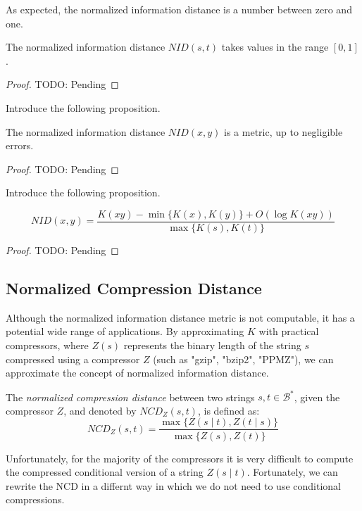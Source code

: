 As expected, the normalized information distance is a number between zero and one.

\begin{proposition}
\label{prop:ncd_between_zero_and_one}
The normalized information distance $NID(s, t)$ takes values in the range $[0, 1]$.
\end{proposition}
\begin{proof}
{\color{red} TODO: Pending}
\end{proof}

{\color{red} Introduce the following proposition.}

\begin{proposition}
The normalized information distance $NID(x, y)$ is a metric, up to negligible errors.
\end{proposition}
\begin{proof}
{\color{red} TODO: Pending}
\end{proof}

{\color{red} Introduce the following proposition.}

\begin{proposition}
\[
NID(x, y) = \frac{ K(xy) - \min\{ K(x), K(y) \} + O(\log K(xy) ) }{ \max \{ K(s), K(t) \} }
\]
\end{proposition}
\begin{proof}
{\color{red} TODO: Pending}
\end{proof}

\subsection*{Normalized Compression Distance}

Although the normalized information distance metric is not computable, it has a potential wide range of applications. By approximating $K$ with practical compressors, where $Z(s)$ represents the binary length of the string $s$ compressed using a compressor $Z$ (such as "gzip", "bzip2", "PPMZ"), we can approximate the concept of normalized information distance. 

\begin{definition}
The \emph{normalized compression distance} between two strings $s,  t \in \mathcal{B}^{\ast}$, given the compressor $Z$, and denoted by $NCD_Z(s, t)$, is defined as:
\[
NCD_Z(s, t) = \frac{\max\{ Z(s \mid t), Z(t \mid s) \}}{\max \{ Z(s), Z(t) \} }
\]
\end{definition}

Unfortunately, for the majority of the compressors it is very difficult to compute the compressed conditional version of a string $Z(s \mid t)$. Fortunately, we can rewrite the NCD in a differnt way in which we do not need to use conditional compressions.

